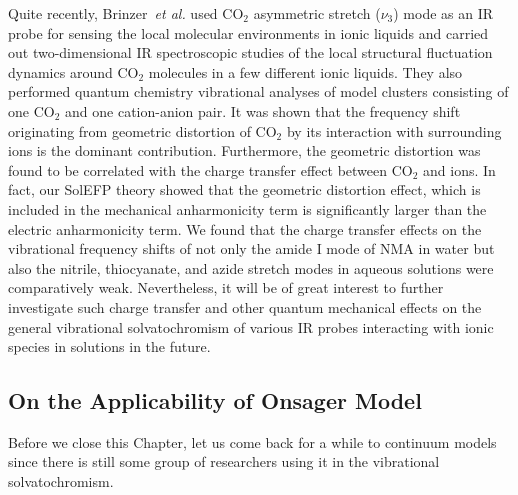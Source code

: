 \documentclass[b5paper,oneside,fleqn,11pt]{book}
\begin{document}
\begin{refsection}
Quite recently, 
Brinzer~\emph{et al.}
used CO$_2$ asymmetric
stretch ($\nu_3$) mode as an IR probe for sensing the local molecular
environments in ionic liquids and carried out two\hyp{}dimensional
IR spectroscopic studies of the local structural fluctuation dynamics
around CO$_2$ molecules in a few different ionic 
liquids. \citep{Brinzer.Berquist.Zhe.Dutta.Johnson.Krisher.Lambrecht.Garrett-Roe.JCP.2015} 
They also performed quantum chemistry vibrational analyses
of model clusters consisting of one CO$_2$ and one cation-anion
pair. It was shown that the frequency shift originating from
geometric distortion of CO$_2$ by its interaction with surrounding
ions is the dominant contribution. Furthermore, the geometric
distortion was found to be correlated with the charge transfer
effect between CO$_2$ and ions. In fact, our SolEFP theory
showed that the geometric distortion effect, which is included
in the mechanical anharmonicity term
is significantly larger than the electric anharmonicity term.
We found that the charge transfer effects on the vibrational
frequency shifts of not only the amide I mode of NMA
in water \citep{Blasiak.Cho.JCP.2014} but also the nitrile, thiocyanate, and
azide stretch modes in aqueous solutions \citep{Lee.Choi.Cho.PCCP.2010} 
were comparatively
weak. Nevertheless, it will be of great interest to further
investigate such charge transfer and other quantum mechanical
effects on the general vibrational solvatochromism of various
IR probes interacting with ionic species in solutions in the
future.

\subsection{On the Applicability of Onsager Model}

Before we close this Chapter, let us come back for a while to
continuum models since there is still some group of researchers
using it in the vibrational solvatochromism. 


\end{refsection}
\end{document}
